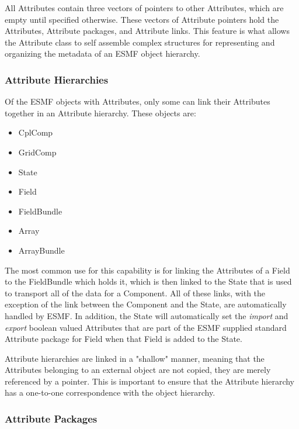 All Attributes contain three vectors of pointers to other Attributes, which are empty until specified otherwise.  These vectors of Attribute pointers hold the Attributes, Attribute packages, and Attribute links.  This feature is what allows the Attribute class to self assemble complex structures for representing and organizing the metadata of an ESMF object hierarchy.

\subsubsection{Attribute Hierarchies}

Of the ESMF objects with Attributes, only some can link their Attributes together in an Attribute hierarchy.  These objects are:

\begin{itemize}
\item CplComp
\item GridComp
\item State
\item Field
\item FieldBundle
\item Array
\item ArrayBundle
\end{itemize}

The most common use for this capability is for linking the Attributes of a Field to the FieldBundle which holds it, which is then linked to the State that is used to transport all of the data for a Component.  All of these links, with the exception of the link between the Component and the State, are automatically handled by ESMF.  In addition, the State will automatically set the {\it import} and {\it export} boolean valued Attributes that are part of the ESMF supplied standard Attribute package for Field when that Field is added to the State. 

Attribute hierarchies are linked in a "shallow" manner, meaning that the Attributes belonging to an external object are not copied, they are merely referenced by a pointer.  This is important to ensure that the Attribute hierarchy has a one-to-one correspondence with the object hierarchy.  

\subsubsection{Attribute Packages}
 \label{desc:AttPacks}

